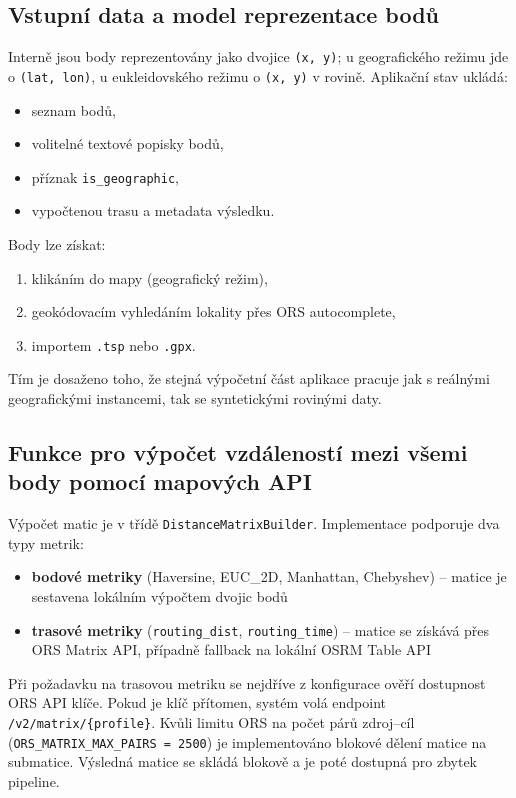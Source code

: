 \subsection{Vstupní data a model reprezentace bodů}
Interně jsou body reprezentovány jako dvojice \texttt{(x, y)}; u geografického režimu jde o \texttt{(lat, lon)}, u eukleidovského režimu o \texttt{(x, y)} v rovině. Aplikační stav ukládá:
\begin{itemize}
    \item seznam bodů,
    \item volitelné textové popisky bodů,
    \item příznak \texttt{is\_geographic},
    \item vypočtenou trasu a metadata výsledku.
\end{itemize}

Body lze získat:
\begin{enumerate}
    \item klikáním do mapy (geografický režim),
    \item geokódovacím vyhledáním lokality přes ORS autocomplete,
    \item importem \texttt{.tsp} nebo \texttt{.gpx}.
\end{enumerate}

Tím je dosaženo toho, že stejná výpočetní část aplikace pracuje jak s reálnými geografickými instancemi, tak se syntetickými rovinými daty.

\subsection{Funkce pro výpočet vzdáleností mezi všemi body pomocí mapových API}
Výpočet matic je v třídě \texttt{DistanceMatrixBuilder}. Implementace podporuje dva typy metrik:
\begin{itemize}
    \item \textbf{bodové metriky} (Haversine, EUC\_2D, Manhattan, Chebyshev) -- matice je sestavena lokálním výpočtem dvojic bodů
    \item \textbf{trasové metriky} (\texttt{routing\_dist}, \texttt{routing\_time}) -- matice se získává přes ORS Matrix API, případně fallback na lokální OSRM Table API
\end{itemize}

Při požadavku na trasovou metriku se nejdříve z konfigurace ověří dostupnost ORS API klíče. Pokud je klíč přítomen, systém volá endpoint \texttt{/v2/matrix/\{profile\}}. Kvůli limitu ORS na počet párů zdroj--cíl (\texttt{ORS\_MATRIX\_MAX\_PAIRS = 2500}) je implementováno blokové dělení matice na submatice. Výsledná matice se skládá blokově a je poté dostupná pro zbytek pipeline.

